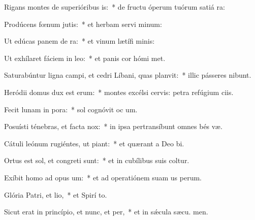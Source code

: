 \item Rigans montes de superióribus is:~* de fructu óperum tuórum satiá ra:
\item Prodúcens fœnum jutis:~* et herbam servi minum:
\item Ut edúcas panem de ra:~* et vinum lætífi  minis:
\item Ut exhílaret fáciem in leo:~* et panis cor hómi met.
\item Saturabúntur ligna campi, et cedri Líbani, quas planvit:~* illic pásseres nibunt.
\item Heródii domus dux est erum:~* montes excélsi cervis: petra refúgium ciis.
\item Fecit lunam in pora:~* sol cognóvit oc um.
\item Posuísti ténebras, et facta  nox:~* in ipsa pertransíbunt omnes bés væ.
\item Cátuli leónum rugiéntes, ut piant:~* et quærant a Deo  bi.
\item Ortus est sol, et congreti sunt:~* et in cubílibus suis coltur.
\item Exíbit homo ad opus um:~* et ad operatiónem suam us  perum.
\item Glória Patri, et lio,~* et Spirí to.
\item Sicut erat in princípio, et nunc, et per,~* et in sǽcula sæcu. men.
